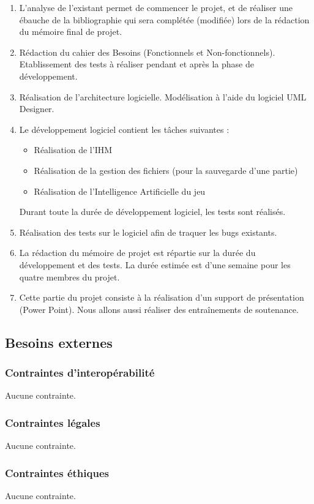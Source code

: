 \begin{enumerate}
\item L'analyse de l'existant permet de commencer le projet, et de réaliser une ébauche de la bibliographie qui sera complétée (modifiée) lors de la rédaction du mémoire final de projet.
\item Rédaction du cahier des Besoins (Fonctionnels et Non-fonctionnels). Etablissement des tests à réaliser pendant et après la phase de développement.
\item Réalisation de l'architecture logicielle. Modélisation à l'aide du logiciel UML Designer.
\item Le développement logiciel contient les tâches suivantes :
  \begin{itemize}
  \item Réalisation de l'IHM 
  \item Réalisation de la gestion des fichiers (pour la sauvegarde d'une partie)
  \item Réalisation de l'Intelligence Artificielle du jeu
  \end{itemize}
  Durant toute la durée de développement logiciel, les tests sont réalisés.
\item Réalisation des tests sur le logiciel afin de traquer les bugs existants.
\item La rédaction du mémoire de projet est répartie sur la durée du développement et des tests. La durée estimée est d'une semaine pour les quatre membres du projet.
\item  Cette partie du projet consiste à la réalisation d'un support de présentation (Power Point). Nous allons aussi réaliser des entraînements de soutenance.
\end{enumerate}

\subsection{Besoins externes}

\subsubsection{Contraintes d'interopérabilité}

Aucune contrainte.

\subsubsection{Contraintes légales}

Aucune contrainte.

\subsubsection{Contraintes éthiques}

Aucune contrainte.



